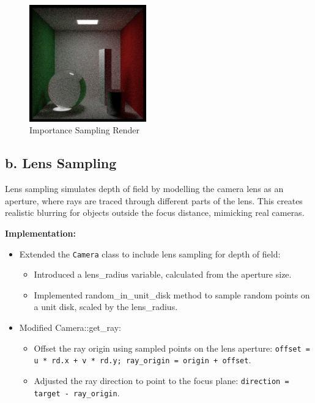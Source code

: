 \documentclass[11pt,a4paper]{article}
\begin{document}
\begin{figure}[h!]  
    \centering  
    \includegraphics[width=0.45\textwidth]{importance sampling.png}  
    \caption{Importance Sampling Render}  
    \label{fig:refraction_fresnel_tir}  
\end{figure}

\subsection{b. Lens Sampling}
\label{sec:lens-sampling}

Lens sampling simulates depth of field by modelling the camera lens as an aperture, where rays are traced through different parts of the lens. This creates realistic blurring for objects outside the focus distance, mimicking real cameras.

\noindent\textbf{Implementation:}
\begin{itemize} 
\item Extended the \texttt{Camera} class to include lens sampling for depth of field:
    \begin{itemize} 
        \item Introduced a lens\_radius variable, calculated from the aperture size.
        \item Implemented random\_in\_unit\_disk method to sample random points on a unit disk, scaled by the lens\_radius.
    \end{itemize}
\item Modified Camera::get\_ray:
    \begin{itemize} \item Offset the ray origin using sampled points on the lens aperture:
    \texttt{offset = u * rd.x + v * rd.y; ray\_origin = origin + offset}.
    \item Adjusted the ray direction to point to the focus plane:
    \texttt{direction = target - ray\_origin}.
    \end{itemize}
\end{itemize}
\end{document}
